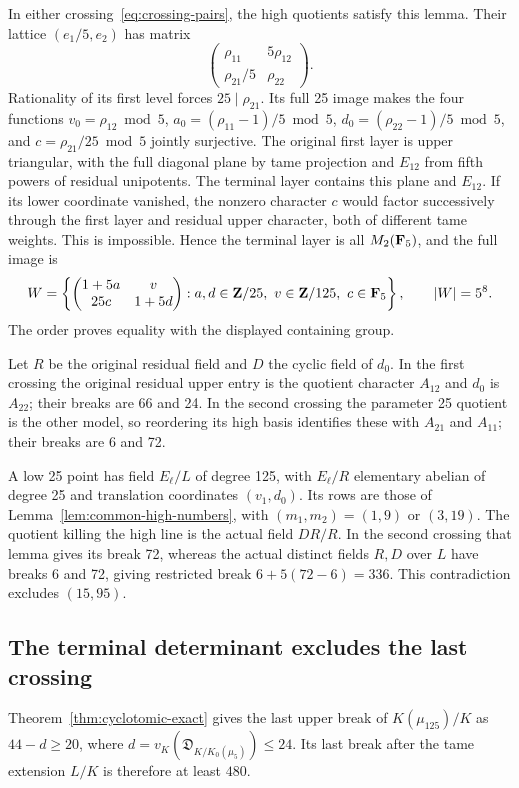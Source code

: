 In either crossing~\eqref{eq:crossing-pairs}, the high quotients satisfy this lemma. Their lattice $(e_1/5,e_2)$ has matrix
\[
 \begin{pmatrix}\rho_{11}&5\rho_{12}\\\rho_{21}/5&\rho_{22}\end{pmatrix}.
\]
Rationality of its first level forces $25\mid\rho_{21}$. Its full 25 image makes the four functions $v_0=\rho_{12}\bmod5$, $a_0=(\rho_{11}-1)/5\bmod5$, $d_0=(\rho_{22}-1)/5\bmod5$, and $c=\rho_{21}/25\bmod5$ jointly surjective. The original first layer is upper triangular, with the full diagonal plane by tame projection and $E_{12}$ from fifth powers of residual unipotents. The terminal layer contains this plane and $E_{12}$. If its lower coordinate vanished, the nonzero character $c$ would factor successively through the first layer and residual upper character, both of different tame weights. This is impossible. Hence the terminal layer is all $M_2(\mathbf F_5)$, and the full image is
\begin{equation}\label{eq:crossing-matrix}
 W=\left\{\begin{pmatrix}1+5a&v\\25c&1+5d\end{pmatrix}:
 a,d\in\mathbf Z/25,\ v\in\mathbf Z/125,\ c\in\mathbf F_5\right\},
 \qquad |W|=5^8.
\end{equation}
The order proves equality with the displayed containing group.

Let $R$ be the original residual field and $D$ the cyclic field of $d_0$. In the first crossing the original residual upper entry is the quotient character $A_{12}$ and $d_0$ is $A_{22}$; their breaks are 66 and 24. In the second crossing the parameter 25 quotient is the other model, so reordering its high basis identifies these with $A_{21}$ and $A_{11}$; their breaks are 6 and 72.

A low 25 point has field $E_\ell/L$ of degree 125, with $E_\ell/R$ elementary abelian of degree 25 and translation coordinates $(v_1,d_0)$. Its rows are those of Lemma~\ref{lem:common-high-numbers}, with $(m_1,m_2)=(1,9)$ or $(3,19)$. The quotient killing the high line is the actual field $DR/R$. In the second crossing that lemma gives its break 72, whereas the actual distinct fields $R,D$ over $L$ have breaks 6 and 72, giving restricted break $6+5(72-6)=336$. This contradiction excludes $(15,95)$.

\subsection{The terminal determinant excludes the last crossing}
Theorem~\ref{thm:cyclotomic-exact} gives the last upper break of $K(\mu_{125})/K$ as $44-d\ge20$, where $d=v_K(\mathfrak D_{K/K_0(\mu_5)})\le24$. Its last break after the tame extension $L/K$ is therefore at least $480$.

